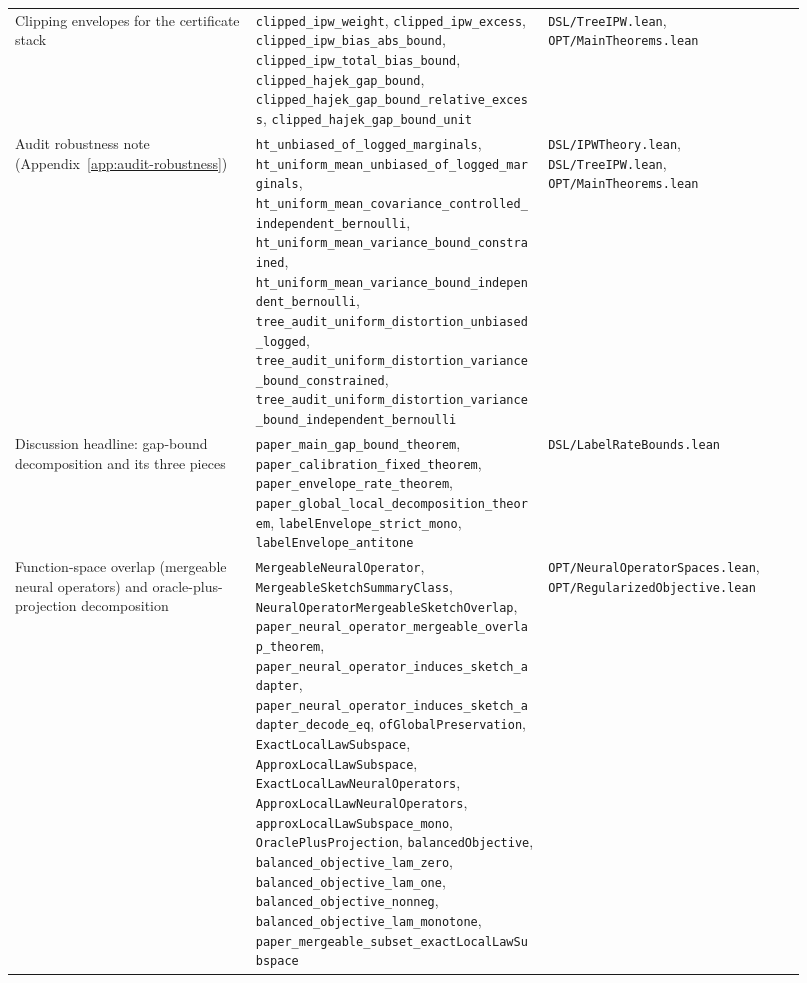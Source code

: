 {\begin{longtable}{p{0.28\linewidth}p{0.34\linewidth}p{0.30\linewidth}}
Clipping envelopes for the certificate stack &
\texttt{clipped\_ipw\_weight}, \texttt{clipped\_ipw\_excess}, \texttt{clipped\_ipw\_bias\_abs\_bound}, \texttt{clipped\_ipw\_total\_bias\_bound}, \texttt{clipped\_hajek\_gap\_bound}, \texttt{clipped\_hajek\_gap\_bound\_relative\_excess}, \texttt{clipped\_hajek\_gap\_bound\_unit} &
\texttt{DSL/TreeIPW.lean}, \texttt{OPT/MainTheorems.lean} \\

Audit robustness note (Appendix~\ref{app:audit-robustness}) &
\texttt{ht\_unbiased\_of\_logged\_marginals}, \texttt{ht\_uniform\_mean\_unbiased\_of\_logged\_marginals}, \texttt{ht\_uniform\_mean\_covariance\_controlled\_independent\_bernoulli}, \texttt{ht\_uniform\_mean\_variance\_bound\_constrained}, \texttt{ht\_uniform\_mean\_variance\_bound\_independent\_bernoulli}, \texttt{tree\_audit\_uniform\_distortion\_unbiased\_logged}, \texttt{tree\_audit\_uniform\_distortion\_variance\_bound\_constrained}, \texttt{tree\_audit\_uniform\_distortion\_variance\_bound\_independent\_bernoulli} &
\texttt{DSL/IPWTheory.lean}, \texttt{DSL/TreeIPW.lean}, \texttt{OPT/MainTheorems.lean} \\

Discussion headline: gap-bound decomposition and its three pieces &
\texttt{paper\_main\_gap\_bound\_theorem}, \texttt{paper\_calibration\_fixed\_theorem}, \texttt{paper\_envelope\_rate\_theorem}, \texttt{paper\_global\_local\_decomposition\_theorem}, \texttt{labelEnvelope\_strict\_mono}, \texttt{labelEnvelope\_antitone} &
\texttt{DSL/LabelRateBounds.lean} \\

Function-space overlap (mergeable neural operators) and oracle-plus-projection decomposition &
\texttt{MergeableNeuralOperator}, \texttt{MergeableSketchSummaryClass}, \texttt{NeuralOperatorMergeableSketchOverlap}, \texttt{paper\_neural\_operator\_mergeable\_overlap\_theorem}, \texttt{paper\_neural\_operator\_induces\_sketch\_adapter}, \texttt{paper\_neural\_operator\_induces\_sketch\_adapter\_decode\_eq}, \texttt{ofGlobalPreservation}, \texttt{ExactLocalLawSubspace}, \texttt{ApproxLocalLawSubspace}, \texttt{ExactLocalLawNeuralOperators}, \texttt{ApproxLocalLawNeuralOperators}, \texttt{approxLocalLawSubspace\_mono}, \texttt{OraclePlusProjection}, \texttt{balancedObjective}, \texttt{balanced\_objective\_lam\_zero}, \texttt{balanced\_objective\_lam\_one}, \texttt{balanced\_objective\_nonneg}, \texttt{balanced\_objective\_lam\_monotone}, \texttt{paper\_mergeable\_subset\_exactLocalLawSubspace} &
\texttt{OPT/NeuralOperatorSpaces.lean}, \texttt{OPT/RegularizedObjective.lean} \\


\end{longtable}}
